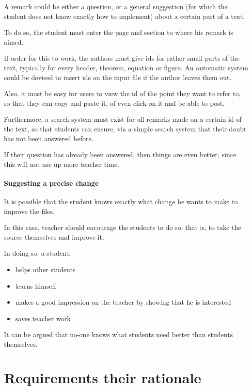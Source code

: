 \documentclass[12pt]{article}
\begin{document}
A remark could be either a question, or a general suggestion (for which the student does not know exactly how to implement) about a certain part of a text.  
  
To do so, the student must enter the page and section to where his remark is aimed.
  
If order for this to work, the authors must give ids for rather small parts of the text, typically for every header, theorem, equation or figure. An automatic system could be devised to insert ids on the input file if the author leaves them out.
  
Also, it must be easy for users to view the id of the point they want to refer to, so that they can copy and paste it, of even click on it and be able to post.
  
Furthermore, a search system must exist for all remarks made on a certain id of the text, so that students can ensure, via a simple search system that their doubt has not been answered before.
  
If their question has already been answered, then things are even better, since this will not use up more teacher time. 
  
\paragraph{Suggesting a precise change} \label{suggesting-a-precise-change}

It is possible that the student knows exactly what change he wants to make to improve the files.

In this case, teacher should encourage the students to do so: that is, to take the source themselves and improve it.

In doing so, a student:

\begin{itemize}
  \item helps other students
  \item learns himself
  \item makes a good impression on the teacher by showing that he is interested
  \item saves teacher work
\end{itemize}

It can be argued that no-one knows what students need better than students themselves.

\section{Requirements their rationale}
\end{document}

